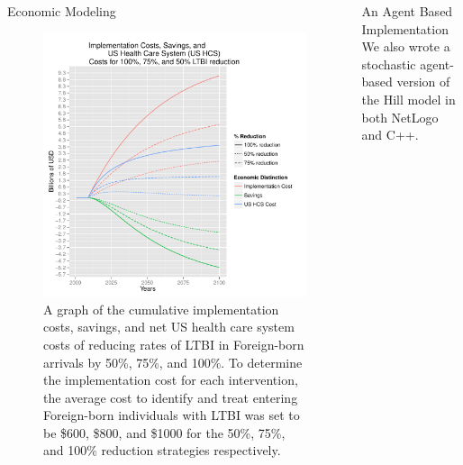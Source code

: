 \documentclass[final]{beamer}
\begin{document}
\begin{frame}
\begin{columns}
\begin{column}{.3\textwidth}
\begin{block}{Economic Modeling}
        \begin{figure}[h]
          \begin{center}
            \includegraphics[scale=1]{EnLTBIRedGroupCost.pdf}
          \end{center}
          \caption{A graph of the cumulative implementation costs, savings, and 
                       net US health care system costs of reducing rates of LTBI in
                       Foreign-born arrivals by 50\%, 75\%, and 100\%.  To determine the 
                       implementation cost for each intervention, the average cost
                       to identify and treat entering Foreign-born individuals with LTBI
                       was set to be \$600, \$800, and \$1000 for the 50\%, 75\%, 
                       and 100\% reduction strategies respectively.}
          \label{fig:redEnLTBI_costs}
        \end{figure}
      \end{block}
    \end{column}
    \begin{column}{.3\textwidth}
      \begin{block}{An Agent Based Implementation}
        We also wrote a stochastic agent-based version of the Hill model in both
        NetLogo and C++.
        \begin{block}{}
          \begin{column}{.45\textwidth}

\end{column}
\end{block}
\end{block}
\end{column}
\end{columns}
\end{frame}
\end{document}
